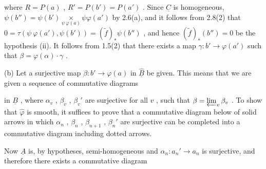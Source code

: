 \begin{center}
\end{center}
where  $R = P(a)$ , $R' = P(b') = P(a')$ . Since $\underline{C}$ is homogeneous, $\psi(b'') = \psi(b') \underset{\psi\ \varphi(a)}{\times} \psi\varphi(a')$ by 2.6(a), and it follows from 2.8(2) that $0 = \tau(\psi\ \varphi(a'), \psi(b')) = (\widetilde{f})_{*}\psi(b'')$ , and hence $(\widetilde{f})_{*}(b'') = 0$ be the hypothesis (ii). It follows from 1.5(2) that there exists a map $\gamma : b' \longrightarrow \varphi(a')$ such that $\beta = \varphi(\alpha)\cdot\gamma$ .

(b)  Let a surjective map $\beta : b' \to \varphi(a)$ in $\widehat{\underline{B}}$ be given. This means that we are given a sequence of commutative diagrams
in $\underline{B}$ , where $\alpha_{v}$ , $\beta_{v}$ , $\beta_{v}'$ are surjective for all $v$ , such that $\beta = \varprojlim_{v} \beta_{v}$ . To show that $\widehat{\varphi}$ is smooth, it suffices to prove that a commutative diagram below of solid arrows in which $\alpha_{n}$ , $\beta_{n}$ , $\beta_{n+1}$ , $\beta_{n}'$ are surjective can be completed into a commutative diagram including dotted arrows.

\begin{center}
\end{center}
Now $\underline{A}$ is, by hypotheses, semi-homogeneous and $\alpha_{n} : a_{n}' \to a_{n}$ is surjective, and therefore there exists a commutative diagram

